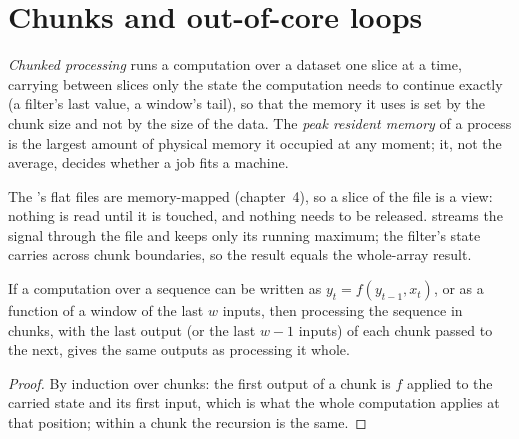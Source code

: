 \section{Chunks and out-of-core loops}

\begin{definition}\label{def:pl:python-at-scale:chunked}
\emph{Chunked processing} runs a computation over a dataset one slice at a time, carrying between slices
only the state the computation needs to continue exactly (a filter's last value, a window's tail), so that the memory it uses is
set by the chunk size and not by the size of the data. The \emph{peak resident memory} of a process is
the largest amount of physical memory it occupied at any moment; it, not the average, decides whether a job fits a machine.
\end{definition}

The 's flat files are memory-mapped (chapter~4), so a slice of the file is a view: nothing is read until it is touched,
and nothing needs to be released.  streams the signal through the file and keeps only its
running maximum; the filter's state carries across chunk boundaries, so the result equals the whole-array result.

\label{lst:pl:python-at-scale:stream}

\begin{proposition}\label{prop:pl:python-at-scale:exact}
If a computation over a sequence can be written as $y_t = f(y_{t-1}, x_t)$, or as a function of a window of the last $w$ inputs, then
processing the sequence in chunks, with the last output (or the last $w-1$ inputs) of each chunk passed to the next, gives the same
outputs as processing it whole.
\end{proposition}

\begin{proof}
By induction over chunks: the first output of a chunk is $f$ applied to the carried state and its first input, which is what the
whole computation applies at that position; within a chunk the recursion is the same.
\end{proof}

